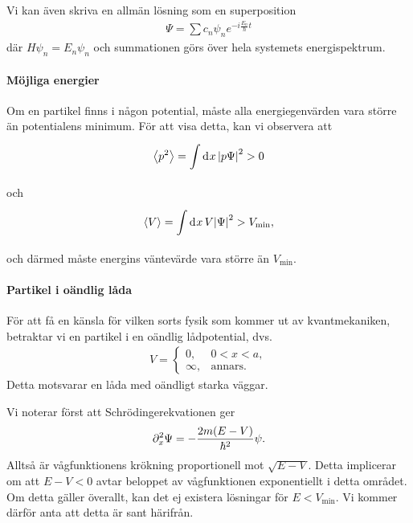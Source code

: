 Vi kan även skriva en allmän lösning som en superposition
\begin{align*}
	\Psi = \sum c_{n}\psi_{n}e^{-i\frac{E_{n}}{\hbar}t}
\end{align*}
där $H\psi_{n} = E_{n}\psi_{n}$ och summationen görs över hela systemets energispektrum.

\paragraph{Möjliga energier}
Om en partikel finns i någon potential, måste alla energiegenvärden vara större än potentialens minimum. För att visa detta, kan vi observera att
\begin{align*}
	\expval{p^{2}} = \integ{}{}{x}{\abs{p\Psi}^{2}} > 0
\end{align*}
och
\begin{align*}
	\expval{V} = \integ{}{}{x}{V\abs{\Psi}^{2}} > V_\text{min},
\end{align*}
och därmed måste energins väntevärde vara större än $V_\text{min}$.

\paragraph{Partikel i oändlig låda}
För att få en känsla för vilken sorts fysik som kommer ut av kvantmekaniken, betraktar vi en partikel i en oändlig lådpotential, dvs.
\begin{align*}
	V = 
	\begin{cases}
		0,      &0 < x < a, \\
		\infty, &\text{annars.}
	\end{cases}
\end{align*}
Detta motsvarar en låda med oändligt starka väggar.

Vi noterar först att Schrödingerekvationen ger
\begin{align*}
	\del[2]{x}{\Psi} = -\frac{2m(E - V)}{\hbar^{2}}\psi.
\end{align*}
Alltså är vågfunktionens krökning proportionell mot $\sqrt{E - V}$. Detta implicerar om att $E - V < 0$ avtar beloppet av vågfunktionen exponentiellt i detta området. Om detta gäller överallt, kan det ej existera lösningar för $E < V_{\text{min}}$. Vi kommer därför anta att detta är sant härifrån.

